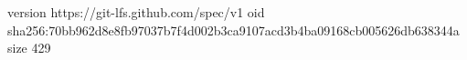 version https://git-lfs.github.com/spec/v1
oid sha256:70bb962d8e8fb97037b7f4d002b3ca9107acd3b4ba09168cb005626db638344a
size 429
